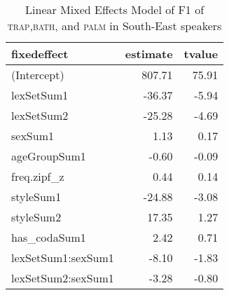 \begin{table}[ht]
\centering
\begin{tabular}{lrr}
  \hline
fixedeffect & estimate & tvalue \\ 
  \hline
(Intercept) & 807.71 & 75.91 \\ 
  lexSetSum1 & -36.37 & -5.94 \\ 
  lexSetSum2 & -25.28 & -4.69 \\ 
  sexSum1 & 1.13 & 0.17 \\ 
  ageGroupSum1 & -0.60 & -0.09 \\ 
  freq.zipf\_z & 0.44 & 0.14 \\ 
  styleSum1 & -24.88 & -3.08 \\ 
  styleSum2 & 17.35 & 1.27 \\ 
  has\_codaSum1 & 2.42 & 0.71 \\ 
  lexSetSum1:sexSum1 & -8.10 & -1.83 \\ 
  lexSetSum2:sexSum1 & -3.28 & -0.80 \\ 
   \hline
\end{tabular}
\caption{Linear Mixed Effects Model of F1 of \textsc{trap},\textsc{bath}, and \textsc{palm} in South-East speakers \label{tbl:TBF1SE}} 
\end{table}
